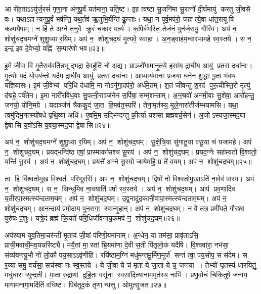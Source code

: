आ रो॑ह॒ताऽऽयु॑र्ज॒रसं॑ गृणा॒ना अ॑नुपू॒र्वं यत॑माना॒ यति॒ष्ट। इ॒ह त्वष्टा॑ सु॒जनि॑मा सु॒रत्नो॑ दी॒र्घमायु॑ करतु जी॒वसे॑ वः। यथाऽहान्यनुपू॒र्वं भव॑न्ति॒ यथ॒र्तव॑ ऋ॒तुभि॒र्यन्ति॑ कॢ॒प्ताः। यथा॒ न पूर्व॒मप॑रो॒ जहात्ये॒वा धा॑त॒रायूषि कल्पयैषाम्। न हि॑ ते अग्ने त॒नुवै क्रू॒रं च॒कार॒ मर्त्य॑। क॒पिर्ब॑भस्ति॒ तेज॑नं॒ पुन॑र्ज॒रायु॒ गौरि॑व। अप॑ न॒ शोशु॑चद॒घमग्ने॑ शुशु॒ध्या र॒यिम्। अप॑ न॒ शोशु॑चद॒घं मृ॒त्यवे॒ स्वाहा। अ॒न॒ड्वाह॑म॒न्वार॑भामहे स्व॒स्तये। स न॒ इन्द्र॑ इव दे॒वेभ्यो॒ वह्नि॑ स॒म्पार॑णो भव॥२३॥

इ॒मे जी॒वा वि॑ मृ॒तैराव॑वर्ति॒न्नभूद्भ॒द्रा दे॒वहू॑तिं नो अ॒द्य। प्राञ्जो॑गामानृ॒तये॒ हसा॑य॒ द्राघी॑य॒ आयु॑ प्रत॒रां दधा॑नाः। मृ॒त्योः प॒दं यो॒पय॑न्तो॒ यदैम॒ द्राघी॑य॒ आयु॑ प्रत॒रां दधा॑नाः। आ॒प्याय॑मानाः प्र॒जया॒ धने॑न शु॒द्धाः पू॒ता भ॑वथ यज्ञियासः। इ॒मं जी॒वेभ्य॑ परि॒धिं द॑धामि॒ मा नोऽनु॑गा॒दप॑रो॒ अर्ध॑मे॒तम्। श॒तं जी॑वन्तु श॒रद॑ पुरू॒चीस्ति॒रो मृ॒त्युं द॑द्महे॒ पर्व॑तेन। इ॒मा नारी॑रविध॒वाः सु॒पत्नी॒राञ्ज॑नेन स॒र्पिषा॒ सम्मृ॑शन्ताम्। अ॒न॒श्रवो॑ अनमी॒वाः सु॒शेवा॒ आरो॑हन्तु॒ जन॑यो॒ योनि॒मग्रे। यदाञ्ज॑नं त्रैककु॒दं जा॒त हि॒मव॑त॒स्परि॑। तेना॒मृत॑स्य॒ मूले॒नारा॑तीर्जम्भयामसि। यथा॒ त्वमु॑द्भि॒नत्स्यो॑षधे पृथि॒व्या अधि॑। ए॒वमि॒म उद्भि॑न्दन्तु की॒र्त्या यश॑सा ब्रह्मवर्च॒सेन॑। अ॒जोऽस्यजा॒स्मद॒घा द्वेषासि य॒वो॑ऽसि य॒वया॒स्मद॒घा द्वेषासि॥२४॥
\anuvakamend[भ॒व॒ ज॒म्भ॒या॒म॒सि॒ त्रीणि॑ च]

अप॑ न॒ शोशु॑चद॒घमग्ने॑ शुशु॒ध्या र॒यिम्। अप॑ न॒ शोशु॑चद॒घम्। सु॒क्षे॒त्रि॒या सु॑गातु॒या व॑सू॒या च॑ यजामहे। अप॑ न॒ शोशु॑चद॒घम्। प्रयद्भन्दि॑ष्ठ एषां॒ प्रास्माका॑सश्च सू॒रय॑। अप॑ न॒ शोशु॑चद॒घम्। प्रयद॒ग्नेः सह॑स्वतो वि॒श्वतो॒ यन्ति॑ सू॒रय॑। अप॑ न॒ शोशु॑चद॒घम्। प्रयत्ते॑ अग्ने सू॒रयो॒ जाये॑महि॒ प्र ते॑ व॒यम्। अप॑ न॒ शोशु॑चद॒घम्॥२५॥

त्व हि वि॑श्वतोमुख वि॒श्वत॑ परि॒भूरसि॑। अप॑ न॒ शोशु॑चद॒घम्। द्विषो॑ नो विश्वतोमु॒खाऽति॑ ना॒वेव॑ पारय। अप॑ न॒ शोशु॑चद॒घम्। स न॒ सिन्धु॑मिव ना॒वयाति॑ पर्\mbox{}षा स्व॒स्तये। अप॑ न॒ शोशु॑चद॒घम्। आप॑ प्रव॒णादि॑व य॒तीरपा॒स्मत्स्य॑न्दताम॒घम्। अप॑ न॒ शोशु॑चद॒घम्। उ॒द्व॒नादु॑द॒कानी॒वापा॒स्मत्स्य॑न्दताम॒घम्। अप॑ न॒ शोशु॑चद॒घम्। आ॒न॒न्दाय॑ प्रमो॒दाय॒ पुन॒रागा॒ स्वान्गृ॒हान्। अप॑ न॒ शोशु॑चद॒घम्। न वै तत्र॒ प्रमी॑यते॒ गौरश्व॒ पुरु॑षः प॒शुः। यत्रे॒दं ब्रह्म॑ क्रि॒यते॑ परि॒धिर्जीव॑नाय॒कमप॑ न॒ शोशु॑चद॒घम्॥२६॥
\anuvakamend[अ॒घम॒घं च॒त्वारि॑ च]

अप॑श्याम युव॒तिमा॒चर॑न्तीं मृ॒ताय॑ जी॒वां प॑रिणी॒यमा॑नाम्। अ॒न्धेन॒ या तम॑सा॒ प्रावृ॑ताऽसि॒ प्राची॒मवा॑ची॒मव॒यन्नरि॑ष्ट्यै। मयै॒तां मा॒स्तां भ्रि॒यमा॑णा दे॒वी स॒ती पि॑तृलो॒कं यदैषि॑। वि॒श्ववा॑रा॒ नभ॑सा॒ संव्य॑यन्त्यु॒भौ नो॑ लो॒कौ पय॒साऽऽवृ॑णीहि। रयि॑ष्ठाम॒ग्निं मधु॑मन्तमू॒र्मिण॒मूर्ज॑ सन्तं त्वा॒ पय॒सोप॒ सस॑देम। स र॒य्या समु॒ वर्च॑सा॒ सच॑स्वा नः स्व॒स्तये। ये जी॒वा ये च॑ मृ॒ता ये जा॒ता ये च॒ जन्त्या। तेभ्यो॑ घृ॒तस्य॑ धारयितुं॒ मधु॑धारा व्युन्द॒ती। मा॒ता रु॒द्राणां दुहि॒ता वसू॑ना॒ स्वसा॑दि॒त्याना॑म॒मृत॑स्य॒ नाभि॑। प्रणु॒वोचं॑ चिकि॒तुषे॒ जना॑य॒ मागामना॑गा॒मदि॑तिं वधिष्ट। पिब॑तूद॒कं तृणान्यत्तु। ओमुत्सृ॒जत॥२७॥
\anuvakamend[व॒धि॒ष्ट॒ द्वे च॑]

